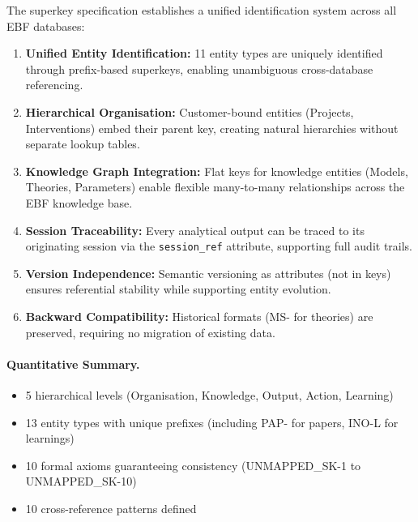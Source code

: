The superkey specification establishes a unified identification system across all EBF databases:

\begin{enumerate}
    \item \textbf{Unified Entity Identification:} 11 entity types are uniquely identified through prefix-based superkeys, enabling unambiguous cross-database referencing.

    \item \textbf{Hierarchical Organisation:} Customer-bound entities (Projects, Interventions) embed their parent key, creating natural hierarchies without separate lookup tables.

    \item \textbf{Knowledge Graph Integration:} Flat keys for knowledge entities (Models, Theories, Parameters) enable flexible many-to-many relationships across the EBF knowledge base.

    \item \textbf{Session Traceability:} Every analytical output can be traced to its originating session via the \texttt{session\_ref} attribute, supporting full audit trails.

    \item \textbf{Version Independence:} Semantic versioning as attributes (not in keys) ensures referential stability while supporting entity evolution.

    \item \textbf{Backward Compatibility:} Historical formats (MS- for theories) are preserved, requiring no migration of existing data.
\end{enumerate}

\paragraph{Quantitative Summary.}
\begin{itemize}
    \item 5 hierarchical levels (Organisation, Knowledge, Output, Action, Learning)
    \item 13 entity types with unique prefixes (including PAP- for papers, INO-L for learnings)
    \item 10 formal axioms guaranteeing consistency (UNMAPPED_SK-1 to UNMAPPED_SK-10)
    \item 10 cross-reference patterns defined
\end{itemize}



